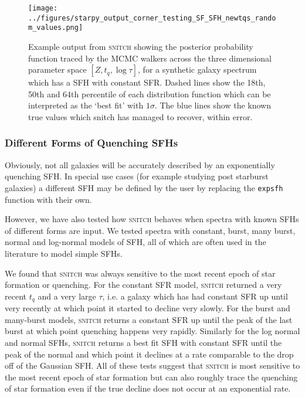 \documentclass[useAMS,usenatbib]{mn2e}
\begin{document}
\begin{figure}
\centering
\texttt{[image: ../figures/starpy\_output\_corner\_testing\_SF\_SFH\_newtqs\_random\_values.png]}
\caption{Example output from \textsc{snitch} showing the posterior probability function traced by the MCMC walkers across the three dimensional parameter space $[Z,t_q,\log \tau]$, for a synthetic galaxy spectrum which has a SFH with constant SFR.  Dashed lines show the 18th, 50th and 64th percentile of each distribution function which can be interpreted as the `best fit' with $1\sigma$. The blue lines show the known true values which snitch has managed to recover, within error. }
\label{fig:sfgal}
\end{figure}


\subsubsection{Different Forms of Quenching SFHs}

Obviously, not all galaxies will be accurately described by an exponentially quenching SFH. In special use cases (for example studying post starburst galaxies) a different SFH may be defined by the user by replacing the \texttt{expsfh} function with their own. 

However, we have also tested how \textsc{snitch} behaves when spectra with known SFHs of different forms are input. We tested spectra with  constant, burst, many burst, normal and log-normal models of SFH, all of which are often used in the literature to model simple SFHs. 

We found that \textsc{snitch} was always sensitive to the most recent epoch of star formation or quenching. For the constant SFR model, \textsc{snitch} returned a very recent $t_q$ and a very large $\tau$, i.e. a galaxy which has had constant SFR up until very recently at which point it started to decline very slowly. For the burst and many-burst models, \textsc{snitch} returns a constant SFR up until the peak of the last burst at which point quenching happens very rapidly. Similarly for the log normal and normal SFHs, \textsc{snitch} returns a best fit SFH with constant SFR until the peak of the normal and which point it declines at a rate comparable to the drop off of the Gaussian SFH. All of these tests suggest that \textsc{snitch} is most sensitive to the most recent epoch of star formation but can also roughly trace the quenching of star formation even if the true decline does not occur at an exponential rate. 
\end{document}
